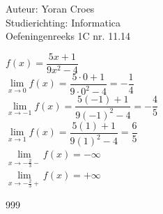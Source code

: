 \documentclass[a4paper]{article}
\begin{document}
\noindent \large Auteur: Yoran Croes \\
\noindent \large Studierichting: Informatica\\
\noindent \large Oefeningenreeks 1C nr. 11.14\\

\medskip

\normalsize

$f(x) = \dfrac{5x + 1}{9x^2 - 4}$ \\

$\lim\limits_{x \rightarrow 0} f(x) = \dfrac{5 \cdot 0 + 1}{9 \cdot 0^2 - 4} = -\dfrac{1}{4}$ \\

$\lim\limits_{x \rightarrow -1} f(x) = \dfrac{5(-1) + 1}{9(-1)^2 - 4} = - \dfrac{4}{5} $ \\

$\lim\limits_{x \rightarrow 1} f(x) = \dfrac{5(1) + 1}{9(1)^2 - 4} = \dfrac{6}{5}$ \\

$\lim\limits_{x \to -\tfrac{2}{3}-} f(x) = -\infty$ \\

$\lim\limits_{x \to -\tfrac{2}{3}+} f(x) = +\infty$ \\



\begin{thebibliography}{999}
\end{thebibliography}
\end{document}
